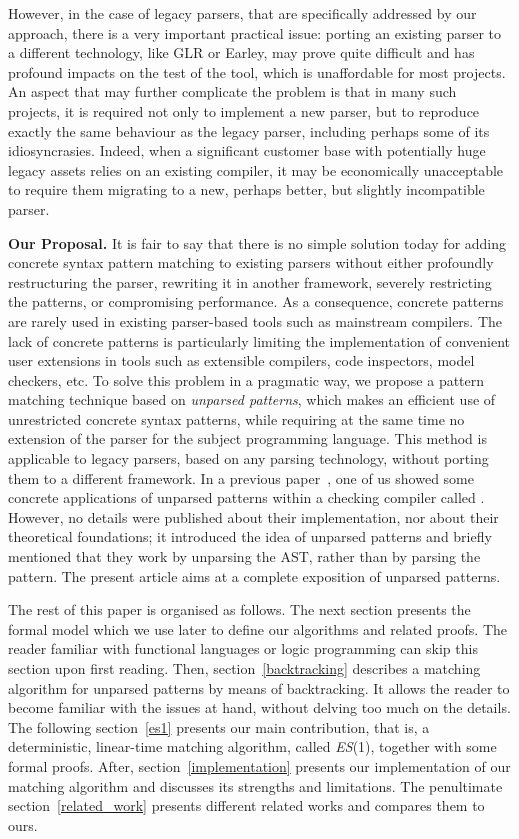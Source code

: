 However, in the case of legacy parsers, that are specifically
addressed by our approach, there is a very important practical issue:
porting an existing parser to a different technology, like GLR or
Earley, may prove quite difficult and has profound impacts on the test
of the tool, which is unaffordable for most projects. An aspect that
may further complicate the problem is that in many such projects, it
is required not only to implement a new parser, but to reproduce
exactly the same behaviour as the legacy parser, including perhaps
some of its idiosyncrasies. Indeed, when a significant customer base
with potentially huge legacy assets relies on an existing compiler, it
may be economically unacceptable to require them migrating to a new,
perhaps better, but slightly incompatible parser.

\noindent\textbf{Our Proposal.} It is fair to say that there is no
simple solution today for adding concrete syntax pattern matching to
existing parsers without either profoundly re\-structuring the parser,
rewriting it in another framework, severe\-ly restricting the
patterns, or compromising performance. As a consequence, concrete
patterns are rarely used in existing parser\hyp{}based tools such as
mainstream compilers. The lack of concrete patterns is particularly
limiting the implementation of convenient user extensions in tools
such as extensible compilers, code inspectors, model checkers, etc. To
solve this problem in a pragmatic way, we propose a pattern matching
technique based on \emph{unparsed patterns}, which makes an efficient
use of unrestricted concrete syntax patterns, while requiring at the
same time no extension of the parser for the subject programming
language. This method is applicable to legacy parsers, based on any
parsing technology, without porting them to a different framework. In
a previous paper~\cite{ppdp}, one of us showed some concrete
applications of unparsed patterns within a checking compiler called
\MyGCC. However, no details were published about their implementation,
nor about their theoretical foundations; it introduced the idea of
unparsed patterns and briefly mentioned that they work by unparsing
the AST, rather than by parsing the pattern. The present article aims
at a complete exposition of unparsed patterns.

The rest of this paper is organised as follows. The next section
presents the formal model which we use later to define our algorithms
and related proofs. The reader familiar with functional languages or
logic programming can skip this section upon first reading.  Then,
section~\ref{backtracking} describes a matching algorithm for unparsed
patterns by means of backtracking. It allows the reader to become
familiar with the issues at hand, without delving too much on the
details. The following section~\ref{es1} presents our main
contribution, that is, a deterministic, linear\hyp{}time matching
algorithm, called \textit{ES}(1), together with some formal
proofs. After, section~\ref{implementation} presents our
implementation of our matching algorithm and discusses its strengths
and limitations. The penultimate section~\ref{related_work} presents
different related works and compares them to ours.

